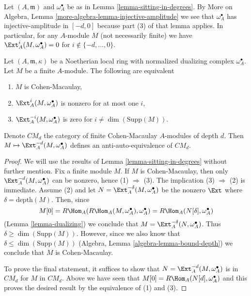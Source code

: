 \begin{remark}
\label{remark-vanishing-for-arbitrary-modules}
Let $(A, \mathfrak m)$ and $\omega_A^\bullet$ be as in
Lemma \ref{lemma-sitting-in-degrees}.
By More on Algebra, Lemma \ref{more-algebra-lemma-injective-amplitude}
we see that $\omega_A^\bullet$ has injective-amplitude in $[-d, 0]$
because part (3) of that lemma applies.
In particular, for any $A$-module $M$ (not necessarily finite) we have
$\Ext^i_A(M, \omega_A^\bullet) = 0$ for $i \not \in \{-d, \ldots, 0\}$.
\end{remark}

\begin{lemma}
\label{lemma-local-CM}
Let $(A, \mathfrak m, \kappa)$ be a Noetherian local ring
with normalized dualizing complex $\omega_A^\bullet$. Let $M$
be a finite $A$-module. The following are equivalent
\begin{enumerate}
\item $M$ is Cohen-Macaulay,
\item $\Ext^i_A(M, \omega_A^\bullet)$ is nonzero for at most one $i$,
\item $\Ext^{-i}_A(M, \omega_A^\bullet)$ is zero for
$i \not = \dim(\text{Supp}(M))$.
\end{enumerate}
Denote $CM_d$ the category of finite Cohen-Macaulay $A$-modules
of depth $d$. Then $M \mapsto \Ext^{-d}_A(M, \omega_A^\bullet)$
defines an anti-auto-equivalence of $CM_d$.
\end{lemma}

\begin{proof}
We will use the results of Lemma \ref{lemma-sitting-in-degrees}
without further mention. Fix a finite module $M$.
If $M$ is Cohen-Macaulay, then only
$\Ext^{-d}_A(M, \omega_A^\bullet)$ can be nonzero,
hence (1) $\Rightarrow$ (3).
The implication (3) $\Rightarrow$ (2) is immediate.
Assume (2) and let $N = \Ext^{-\delta}_A(M, \omega_A^\bullet)$
be the nonzero $\Ext$ where $\delta = \text{depth}(M)$. Then, since
$$
M[0] = R\Hom_A(R\Hom_A(M, \omega_A^\bullet), \omega_A^\bullet) =
R\Hom_A(N[\delta], \omega_A^\bullet)
$$
(Lemma \ref{lemma-dualizing})
we conclude that $M = \Ext_A^{-\delta}(N, \omega_A^\bullet)$.
Thus $\delta \geq \dim(\text{Supp}(M))$. However,
since we also know that $\delta \leq \dim(\text{Supp}(M))$
(Algebra, Lemma \ref{algebra-lemma-bound-depth}) we conclude that $M$ is
Cohen-Macaulay.

\medskip\noindent
To prove the final statement, it suffices to show that
$N = \Ext^{-d}_A(M, \omega_A^\bullet)$ is in $CM_d$
for $M$ in $CM_d$. Above we have seen that
$M[0] = R\Hom_A(N[d], \omega_A^\bullet)$ and this proves the
desired result by the equivalence of (1) and (3).
\end{proof}

